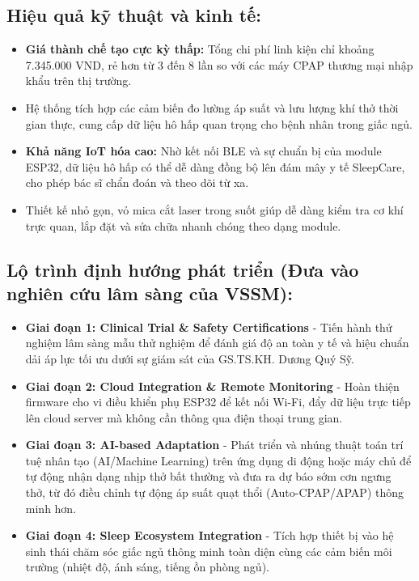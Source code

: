 \documentclass[12pt,a4paper]{article}
\begin{document}
\subsection{Hiệu quả kỹ thuật và kinh tế:}
\begin{itemize}
    \item \textbf{Giá thành chế tạo cực kỳ thấp:} Tổng chi phí linh kiện chỉ khoảng 7.345.000 VND, rẻ hơn từ 3 đến 8 lần so với các máy CPAP thương mại nhập khẩu trên thị trường.
    \item Hệ thống tích hợp các cảm biến đo lường áp suất và lưu lượng khí thở thời gian thực, cung cấp dữ liệu hô hấp quan trọng cho bệnh nhân trong giấc ngủ.
    \item \textbf{Khả năng IoT hóa cao:} Nhờ kết nối BLE và sự chuẩn bị của module ESP32, dữ liệu hô hấp có thể dễ dàng đồng bộ lên đám mây y tế SleepCare, cho phép bác sĩ chẩn đoán và theo dõi từ xa.
    \item Thiết kế nhỏ gọn, vỏ mica cắt laser trong suốt giúp dễ dàng kiểm tra cơ khí trực quan, lắp đặt và sửa chữa nhanh chóng theo dạng module.
\end{itemize}

\subsection{Lộ trình định hướng phát triển (Đưa vào nghiên cứu lâm sàng của VSSM):}
\begin{itemize}
    \item \textbf{Giai đoạn 1: Clinical Trial \& Safety Certifications} - Tiến hành thử nghiệm lâm sàng mẫu thử nghiệm để đánh giá độ an toàn y tế và hiệu chuẩn dải áp lực tối ưu dưới sự giám sát của GS.TS.KH. Dương Quý Sỹ.
    \item \textbf{Giai đoạn 2: Cloud Integration \& Remote Monitoring} - Hoàn thiện firmware cho vi điều khiển phụ ESP32 để kết nối Wi-Fi, đẩy dữ liệu trực tiếp lên cloud server mà không cần thông qua điện thoại trung gian.
    \item \textbf{Giai đoạn 3: AI-based Adaptation} - Phát triển và nhúng thuật toán trí tuệ nhân tạo (AI/Machine Learning) trên ứng dụng di động hoặc máy chủ để tự động nhận dạng nhịp thở bất thường và đưa ra dự báo sớm cơn ngưng thở, từ đó điều chỉnh tự động áp suất quạt thổi (Auto-CPAP/APAP) thông minh hơn.
    \item \textbf{Giai đoạn 4: Sleep Ecosystem Integration} - Tích hợp thiết bị vào hệ sinh thái chăm sóc giấc ngủ thông minh toàn diện cùng các cảm biến môi trường (nhiệt độ, ánh sáng, tiếng ồn phòng ngủ).
\end{itemize}
\end{document}
